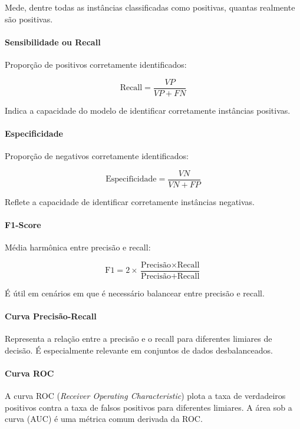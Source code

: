 \documentclass[12pt]{article}
\begin{document}
Mede, dentre todas as instâncias classificadas como positivas, quantas realmente são positivas.

\paragraph{Sensibilidade ou Recall} Proporção de positivos corretamente identificados:

\begin{equation}
\text{Recall} = \frac{VP}{VP + FN}
\end{equation}

Indica a capacidade do modelo de identificar corretamente instâncias positivas.

\paragraph{Especificidade} Proporção de negativos corretamente identificados:

\begin{equation}
\text{Especificidade} = \frac{VN}{VN + FP}
\end{equation}

Reflete a capacidade de identificar corretamente instâncias negativas.

\paragraph{F1-Score} Média harmônica entre precisão e recall:

\begin{equation}
\text{F1} = 2 \times \frac{\text{Precisão} \times \text{Recall}}{\text{Precisão} + \text{Recall}}
\end{equation}

É útil em cenários em que é necessário balancear entre precisão e recall.

\paragraph{Curva Precisão-Recall} Representa a relação entre a precisão e o recall para diferentes limiares de decisão. É especialmente relevante em conjuntos de dados desbalanceados.

\paragraph{Curva ROC} A curva ROC (\emph{Receiver Operating Characteristic}) plota a taxa de verdadeiros positivos contra a taxa de falsos positivos para diferentes limiares. A área sob a curva (AUC) é uma métrica comum derivada da ROC.
\end{document}
